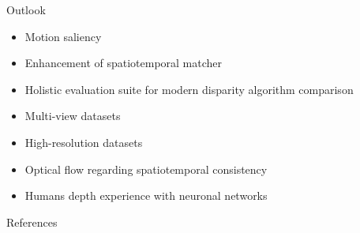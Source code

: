 \documentclass[10pt]{beamer}
\begin{document}
\begin{frame}[fragile]{Outlook}
  \begin{itemize}
    \item Motion saliency
    \item Enhancement of spatiotemporal matcher
    \item Holistic evaluation suite for modern disparity algorithm comparison
    \item Multi-view datasets
    \item High-resolution datasets
    \item Optical flow regarding spatiotemporal consistency
    \item Humans depth experience with neuronal networks
  \end{itemize}
\end{frame}


\begin{frame}[allowframebreaks]{References}

  
  

\end{frame}
\end{document}
